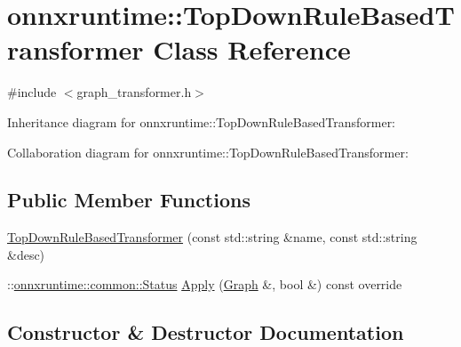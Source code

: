 \hypertarget{classonnxruntime_1_1TopDownRuleBasedTransformer}{}\section{onnxruntime\+:\+:Top\+Down\+Rule\+Based\+Transformer Class Reference}
\label{classonnxruntime_1_1TopDownRuleBasedTransformer}


{\ttfamily \#include $<$graph\+\_\+transformer.\+h$>$}



Inheritance diagram for onnxruntime\+:\+:Top\+Down\+Rule\+Based\+Transformer\+:


Collaboration diagram for onnxruntime\+:\+:Top\+Down\+Rule\+Based\+Transformer\+:
\subsection*{Public Member Functions}
\begin{DoxyCompactItemize}
\item 
\mbox{\hyperlink{classonnxruntime_1_1TopDownRuleBasedTransformer_ae6a305d7d2d284967c9e71e4923d0b7e}{Top\+Down\+Rule\+Based\+Transformer}} (const std\+::string \&name, const std\+::string \&desc)
\item 
\+::\mbox{\hyperlink{classonnxruntime_1_1common_1_1Status}{onnxruntime\+::common\+::\+Status}} \mbox{\hyperlink{classonnxruntime_1_1TopDownRuleBasedTransformer_ae7604b4ac9da64b2bcae450b4759f624}{Apply}} (\mbox{\hyperlink{classonnxruntime_1_1Graph}{Graph}} \&, bool \&) const override
\end{DoxyCompactItemize}


\subsection{Constructor \& Destructor Documentation}
\mbox{\label{classonnxruntime_1_1TopDownRuleBasedTransformer_ae6a305d7d2d284967c9e71e4923d0b7e}} 
